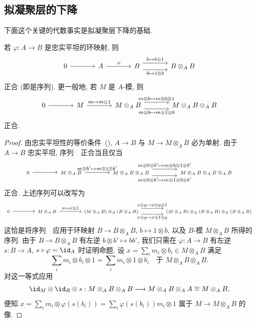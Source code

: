 \subsection{拟凝聚层的下降}\label{src:3.1.1-subsection}
下面这个关键的代数事实是拟凝聚层下降的基础.
\begin{proposition}\label{src:3.1.1}
若 $\varphi:A\to B$ 是忠实平坦的环映射, 则
\[
\begin{tikzcd}[column sep=large]
0\arrow[r]&A\arrow[r,"\varphi"]&B
\arrow[r,shift left=1.1ex,"b\mapsto b\otimes1"]
\arrow[r,shift right=1.1ex,"b\mapsto1\otimes b"']&B\otimes_A B
\end{tikzcd}
\]
正合 (即是序列). 更一般地, 若 $M$ 是 $A$-模, 则
\begin{equation}\label{src:3.1.2}
\begin{tikzcd}[column sep=large]
0\arrow[r]&M\arrow[r,"m\mapsto m\otimes1"]&M\otimes_A B
\arrow[r,shift left=1.1ex,"m\otimes b\mapsto m\otimes b\otimes1"]
\arrow[r,shift right=1.1ex,"m\otimes b\mapsto m\otimes1\otimes b"']&M\otimes_A B\otimes_A B
\end{tikzcd}
\end{equation}
正合.
\end{proposition}
\begin{proof}
由忠实平坦性的等价条件~(), $A\to B$ 与 $M\to M\otimes_A B$ 必为单射. 由于 $A\to B$ 忠实平坦, 序列~~正合当且仅当
\[
\begin{tikzcd}[font=\scriptsize,column sep=large]
0\arrow[r]&M\otimes_A B
\arrow[r,"m\otimes b'\mapsto m\otimes1\otimes b'"]&
M\otimes_A B\otimes_A B
\arrow[r,shift left=1.1ex,"m\otimes b\otimes b'\mapsto m\otimes b\otimes1\otimes b'"]
\arrow[r,shift right=1.1ex,"m\otimes b\otimes b'\mapsto m\otimes1\otimes b\otimes b'"']&
M\otimes_A B\otimes_A B\otimes_A B
\end{tikzcd}
\]
正合. 上述序列可以改写为
\[
\begin{tikzcd}[font=\scriptsize,column sep=large]
0\arrow[r]&M\otimes_A B\arrow[r,"x\mapsto x\otimes1"]&
(M\otimes_A B)\otimes_B(B\otimes_A B)
\arrow[r,shift left=1.1ex,"x\otimes y\mapsto x\otimes y\otimes1"]
\arrow[r,shift right=1.1ex,"x\otimes y\mapsto x\otimes1\otimes y"']&
(M\otimes_A B)\otimes_B(B\otimes_A B)\otimes_B(B\otimes_A B)
\end{tikzcd}
\]
这恰是将序列~~应用于环映射 $B\to B\otimes_A B$, $b\mapsto1\otimes b$, 以及 $B$-模 $M\otimes_A B$ 所得的序列. 由于 $B\to B\otimes_A B$ 有左逆 $b\otimes b'\mapsto bb'$, 我们只需在 $\varphi:A\to B$ 有左逆 $s:B\to A$, $s\circ\varphi=\id_A$ 时证明命题. 设 $x=\sum_i m_i\otimes b_i\in M\otimes_A B$ 满足
\[
\sum_i m_i\otimes b_i\otimes1=\sum_i m_i\otimes1\otimes b_i
\quad\text{于 }M\otimes_A B\otimes_A B.
\]
对这一等式应用
\[
\id_M\otimes\id_B\otimes s:
M\otimes_A B\otimes_A B\longrightarrow
M\otimes_A B\otimes_A A\cong M\otimes_A B,
\]
便知 $x=\sum_i m_i\otimes\varphi(s(b_i))
=\sum_i\varphi(s(b_i))m_i\otimes1$ 属于 $M\to M\otimes_A B$ 的像.
\end{proof}

